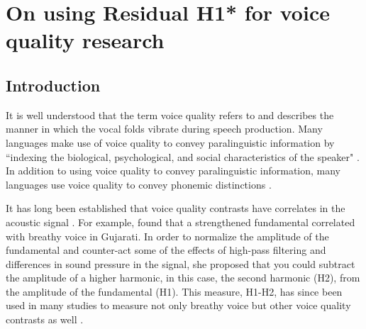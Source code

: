 
\chapter{On using Residual H1* for voice quality research} \label{ch:residual_h1}
\section{Introduction} \label{sec:Intro}

It is well understood that the term voice quality refers to and describes the manner in which the vocal folds vibrate during speech production. Many languages make use of voice quality to convey paralinguistic information by ``indexing the biological, psychological, and social characteristics of the speaker" \citep{laverVoiceQualityIndexical1968,podesvaStanceWindowLanguageRace2016}. In addition to using voice quality to convey paralinguistic information, many languages use voice quality to convey phonemic distinctions \citep{garellekPhoneticsVoice2019}. 

It has long been established that voice quality contrasts have correlates in the acoustic signal \citep{fischer-jorgensenPhoneticAnalysisBreathy1968,buderAcousticAnalysisVoice1999,kentVoiceQualityMeasurement1999}. For example, \citet{fischer-jorgensenPhoneticAnalysisBreathy1968} found that a strengthened fundamental correlated with breathy voice in Gujarati. In order to normalize the amplitude of the fundamental and counter-act some of the effects of high-pass filtering and differences in sound pressure in the signal, she proposed that you could subtract the amplitude of a higher harmonic, in this case, the second harmonic (H2), from the amplitude of the fundamental (H1). This measure, H1-H2, has since been used in many studies to measure not only breathy voice but other voice quality contrasts as well \citep{garellekPhoneticsVoice2019,chaiH1H2Acoustic2022}.

